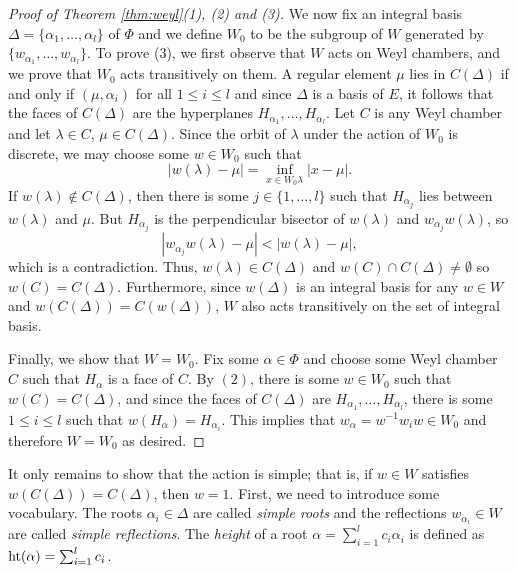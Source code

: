 \begin{proof}[Proof of Theorem \ref{thm:weyl}(1), (2) and (3)]
    We now fix an integral basis $\Delta=\{\alpha_1,\ldots,\alpha_l\}$ of $\Phi$ and we define $W_0$ to be the subgroup of $W$ generated by $\{w_{\alpha_1},\ldots,w_{\alpha_l}\}$. To prove (3), we first observe that $W$ acts on Weyl chambers, and we prove that $W_0$ acts transitively on them. A regular element $\mu$ lies in $C(\Delta)$ if and only if $(\mu,\alpha_i)$ for all $1\leq i\leq l$ and since $\Delta$ is a basis of $E$, it follows that the faces of $C(\Delta)$ are the hyperplanes $H_{\alpha_1},\ldots,H_{\alpha_l}$. Let $C$ is any Weyl chamber and let $\lambda\in C$, $\mu\in C(\Delta)$. Since the orbit of $\lambda$ under the action of $W_0$ is discrete, we may choose some $w\in W_0$ such that 
    $$|w(\lambda)-\mu|=\inf_{x\in W_0\lambda}|x-\mu|.$$
    If $w(\lambda)\not\in C(\Delta)$, then there is some $j\in\{1,\ldots,l\}$ such that $H_{\alpha_j}$ lies between $w(\lambda)$ and $\mu$. But $H_{\alpha_j}$ is the perpendicular bisector of $w(\lambda)$ and $w_{\alpha_j}w(\lambda)$, so 
    $$|w_{\alpha_j}w(\lambda)-\mu|<|w(\lambda)-\mu|,$$
    which is a contradiction. Thus, $w(\lambda)\in C(\Delta)$ and $w(C)\cap C(\Delta)\neq\emptyset$ so $w(C)=C(\Delta)$.
    Furthermore, since $w(\Delta)$ is an integral basis for any $w\in W$ and $w(C(\Delta))=C(w(\Delta))$, $W$ also acts transitively on the set of integral basis.

    Finally, we show that $W=W_0$. Fix some $\alpha\in\Phi$ and choose some Weyl chamber $C$ such that $H_\alpha$ is a face of $C$. By $(2)$, there is some $w\in W_0$ such that $w(C)=C(\Delta)$, and since the faces of $C(\Delta)$ are $H_{\alpha_1},\ldots,H_{\alpha_l}$, there is some $1\leq i\leq l$ such that $w(H_\alpha)=H_{\alpha_i}$. This implies that $w_\alpha=w^{-1}w_iw\in W_0$ and therefore $W=W_0$ as desired.
\end{proof}

It only remains to show that the action is simple; that is, if $w\in W$ satisfies $w(C(\Delta))=C(\Delta)$, then $w=1$. First, we need to introduce some vocabulary. The roots $\alpha_i\in\Delta$ are called \textit{simple roots} and the reflections $w_{\alpha_i}\in W$ are called \textit{simple reflections}. The \textit{height} of a root $\alpha=\sum_{i=1}^{l}c_i\alpha_i$ is defined as $\mathrm{ht}(\alpha)=\sum_{i=1}^{l}c_i$.

